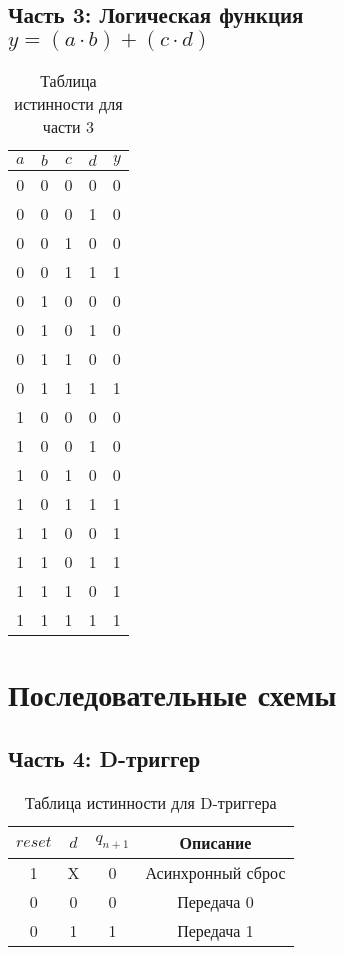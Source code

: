 \documentclass[12pt,a4paper]{article}
\begin{document}
\subsection{Часть 3: Логическая функция $y = (a \cdot b) + (c \cdot d)$}

\begin{table}[h]
\centering
\caption{Таблица истинности для части 3}
\begin{tabular}{|c|c|c|c|c|}
\hline
$a$ & $b$ & $c$ & $d$ & $y$ \\
\hline
0 & 0 & 0 & 0 & 0 \\
0 & 0 & 0 & 1 & 0 \\
0 & 0 & 1 & 0 & 0 \\
0 & 0 & 1 & 1 & 1 \\
0 & 1 & 0 & 0 & 0 \\
0 & 1 & 0 & 1 & 0 \\
0 & 1 & 1 & 0 & 0 \\
0 & 1 & 1 & 1 & 1 \\
1 & 0 & 0 & 0 & 0 \\
1 & 0 & 0 & 1 & 0 \\
1 & 0 & 1 & 0 & 0 \\
1 & 0 & 1 & 1 & 1 \\
1 & 1 & 0 & 0 & 1 \\
1 & 1 & 0 & 1 & 1 \\
1 & 1 & 1 & 0 & 1 \\
1 & 1 & 1 & 1 & 1 \\
\hline
\end{tabular}
\end{table}

\section{Последовательные схемы}

\subsection{Часть 4: D-триггер}

\begin{table}[h]
\centering
\caption{Таблица истинности для D-триггера}
\begin{tabular}{|c|c|c|c|}
\hline
$reset$ & $d$ & $q_{n+1}$ & Описание \\
\hline
1 & X & 0 & Асинхронный сброс \\
0 & 0 & 0 & Передача 0 \\
0 & 1 & 1 & Передача 1 \\
\hline
\end{tabular}
\end{table}
\end{document}
